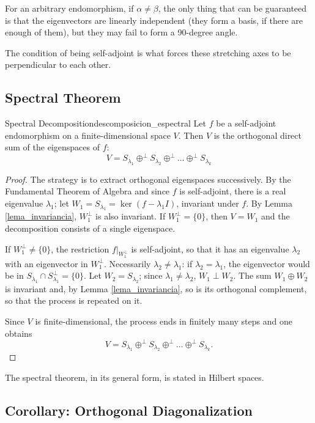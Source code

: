\documentclass[11pt, a4paper]{article}
\begin{document}
    For an arbitrary endomorphism, if $\alpha \neq \beta$, the only thing that can be guaranteed is that the eigenvectors are linearly independent (they form a basis, if there are enough of them), but they may fail to form a 90-degree angle.
    
    The condition of being self-adjoint is what forces these stretching axes to be perpendicular to each other.

\subsection{Spectral Theorem}

\begin{teorema}{Spectral Decomposition}{descomposicion_espectral}
Let $f$ be a self-adjoint endomorphism on a finite-dimensional space $V$.
Then $V$ is the orthogonal direct sum of the eigenspaces of $f$:
\[ V = S_{\lambda_1} \oplus^\perp S_{\lambda_2} \oplus^\perp \dots \oplus^\perp S_{\lambda_k} \]
\end{teorema}

\begin{proof}
The strategy is to extract orthogonal eigenspaces successively. By the Fundamental Theorem of Algebra and since $f$ is self-adjoint, there is a real eigenvalue $\lambda_1$; let $W_1 = S_{\lambda_1} = \ker(f - \lambda_1 I)$, invariant under $f$. By Lemma \ref{lema_invariancia}, $W_1^\perp$ is also invariant. If $W_1^\perp = \{0\}$, then $V = W_1$ and the decomposition consists of a single eigenspace.

If $W_1^\perp \neq \{0\}$, the restriction $f|_{W_1^\perp}$ is self-adjoint, so that it has an eigenvalue $\lambda_2$ with an eigenvector in $W_1^\perp$. Necessarily $\lambda_2 \neq \lambda_1$: if $\lambda_2 = \lambda_1$, the eigenvector would be in $S_{\lambda_1} \cap S_{\lambda_1}^\perp = \{0\}$. Let $W_2 = S_{\lambda_2}$; since $\lambda_1 \neq \lambda_2$, $W_1 \perp W_2$. The sum $W_1 \oplus W_2$ is invariant and, by Lemma \ref{lema_invariancia}, so is its orthogonal complement, so that the process is repeated on it.

Since $V$ is finite-dimensional, the process ends in finitely many steps and one obtains
\[ V = S_{\lambda_1} \oplus^\perp S_{\lambda_2} \oplus^\perp \dots \oplus^\perp S_{\lambda_k}. \]
\end{proof}

\obs The spectral theorem, in its general form, is stated in Hilbert spaces.

\subsection{Corollary: Orthogonal Diagonalization}
\end{document}
